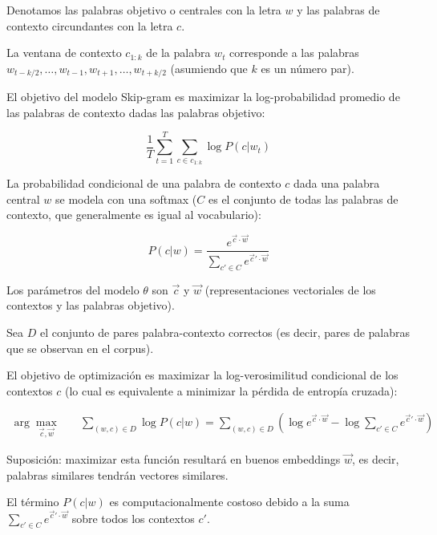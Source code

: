 Denotamos las palabras objetivo o centrales con la letra $w$ y las palabras de contexto circundantes con la letra $c$.

La ventana de contexto $c_{1:k}$ de la palabra $w_t$ corresponde a las palabras $w_{t-k/2},\dots, w_{t-1}, w_{t+1}, \dots, w_{t+k/2}$ (asumiendo que $k$ es un número par).

El objetivo del modelo Skip-gram es maximizar la log-probabilidad promedio de las palabras de contexto dadas las palabras objetivo:

\begin{displaymath}
\frac{1}{T} \sum_{t=1}^T \sum_{c \in c_{1:k}} \log P(c|w_t)
\end{displaymath}

La probabilidad condicional de una palabra de contexto $c$ dada una palabra central $w$ se modela con una softmax ($C$ es el conjunto de todas las palabras de contexto, que generalmente es igual al vocabulario):

\begin{displaymath}
P(c|w) = \frac{e^{\vec{c}\cdot \vec{w}}}{\sum_{c'\in C} e^{\vec{c}'\cdot \vec{w}}}
\end{displaymath}

Los parámetros del modelo $\theta$ son $\vec{c}$ y $\vec{w}$ (representaciones vectoriales de los contextos y las palabras objetivo).

Sea $D$ el conjunto de pares palabra-contexto correctos (es decir, pares de palabras que se observan en el corpus).

El objetivo de optimización es maximizar la log-verosimilitud condicional de los contextos $c$ (lo cual es equivalente a minimizar la pérdida de entropía cruzada):

\begin{equation}
\begin{split}
\operatorname{arg} \max_{\vec{c}, \vec{w}} & \quad \sum_{(w,c) \in D}{\log P(c|w)} = \sum_{(w,c) \in D} ( \log e^{\vec{c}\cdot \vec{w}} - \log \sum_{c'\in C} e^{\vec{c}'\cdot \vec{w}} )
\end{split}
\end{equation}

Suposición: maximizar esta función resultará en buenos embeddings $\vec{w}$, es decir, palabras similares tendrán vectores similares.

El término $P(c|w)$ es computacionalmente costoso debido a la suma $\sum_{c'\in C} e^{\vec{c}'\cdot \vec{w}}$ sobre todos los contextos $c'$.

